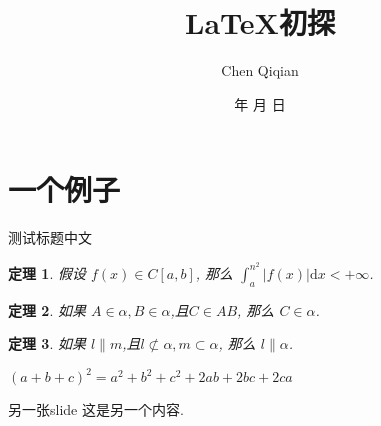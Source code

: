 \documentclass[UTF-8]{beamer} %
\begin{document}
    \renewcommand{\today}{\number\year 年 \number\month 月 \number\day 日}
    \newtheorem{thm}{定理}[section]
     
    \title[\LaTeX~初探]{\LaTeX 初探}
    \author{Chen Qiqian}
    \date{\today}
     
    \frame{\titlepage}
    \frame{\tableofcontents}
     
    \section{一个例子}

    \begin{frame}[t]{测试标题中文}
    \begin{thm}
      假设 $f(x)\in C[a,b]$, 那么 $\int_a^{n^2} |f(x)| \mathrm{d}x<+\infty$.
    \end{thm}
    \pause
    \begin{thm}
        如果 $A \in \alpha, B \in \alpha$,且$C \in AB $, 那么 $C \in \alpha$.
    \end{thm}
    \begin{thm}
        如果 $l \parallel m$,且$l \not\subset \alpha ,m\subset \alpha $, 那么 $l \parallel \alpha$.
    \end{thm}
    \textit{$ (a+b+c)^2 = a^2 + b^2 + c^2 + 2ab + 2bc +2ca$}
    \end{frame}
     
    \begin{frame}[fragile]{另一张slide}%
        这是另一个内容.
    \end{frame}

    
\end{document}
